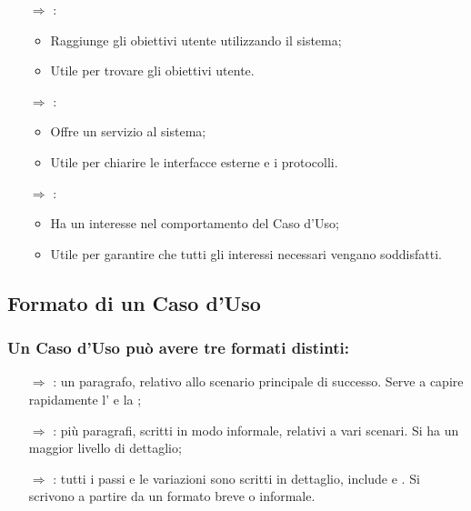 \begin{itemize}
    \item [$\Rightarrow$] :
    \begin{itemize}
        \item Raggiunge gli obiettivi utente utilizzando il sistema;
        \item Utile per trovare gli obiettivi utente.
    \end{itemize}
    \item [$\Rightarrow$] :
    \begin{itemize}
        \item Offre un servizio al sistema;
        \item Utile per chiarire le interfacce esterne e i protocolli.
    \end{itemize}
    \item [$\Rightarrow$] :
    \begin{itemize}
        \item Ha un interesse nel comportamento del Caso d'Uso;
        \item Utile per garantire che tutti gli interessi necessari vengano soddisfatti.
    \end{itemize}
\end{itemize}

\subsection{Formato di un Caso d'Uso}

\subsubsection{Un Caso d'Uso può avere tre formati distinti:}

\begin{itemize}
    \item [$\Rightarrow$] : un paragrafo, relativo allo scenario principale di successo. Serve a capire rapidamente l' e la ;
    \item [$\Rightarrow$] : più paragrafi, scritti in modo informale, relativi a vari scenari. Si ha un maggior livello di dettaglio;
    \item [$\Rightarrow$] : tutti i passi e le variazioni sono scritti in dettaglio, include  e . Si scrivono a partire da un formato breve o informale.
\end{itemize}

